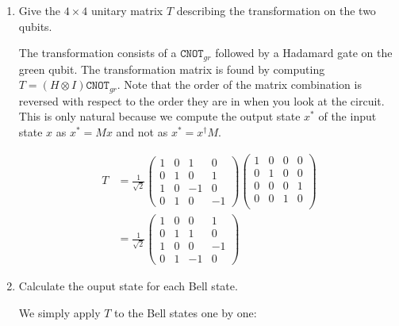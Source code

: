 \documentclass[12pt]{article}
\newcommand{\pmat}[1]{\begin{pmatrix}#1\end{pmatrix}}
\newcommand{\rsqrt}[1]{\ensuremath{\frac{1}{\sqrt{#1}}}}
\newenvironment{answer}{\begingroup\setlength{\leftskip}{-\leftmargin}\begin{framed}}{\end{framed}\endgroup}
\newcommand{\CNOT}[1]{\ensuremath{\texttt{CNOT}_{#1}}}
\newcommand{\cnotgr}[1]{\ensuremath{\pmat{%
        1 & 0 & 0 & 0 \\%
        0 & 1 & 0 & 0 \\%
        0 & 0 & 0 & 1 \\%
        0 & 0 & 1 & 0 \\%
}}}
\begin{document}
\begin{enumerate}
    \item Give the $4 \times 4$ unitary matrix $T$ describing the transformation on the two qubits.

    \begin{answer}
        The transformation consists of a \CNOT{gr} followed by a Hadamard gate on the green qubit. The transformation matrix is found by computing $T = (H \otimes I)\CNOT{gr}$. Note that the order of the matrix combination is reversed with respect to the order they are in when you look at the circuit. This is only natural because we compute the output state $x^*$ of the input state $x$  as $x^* = Mx$ and not as $x^* = x^\dagger{}M$.

        \begin{align*}
            T &= \rsqrt{2}\pmat{1&0&1&0\\0&1&0&1\\1&0&-1&0\\0&1&0&-1}\cnotgr{} \\
            &= \rsqrt{2}\pmat{1&0&0&1\\0&1&1&0\\1&0&0&-1\\0&1&-1&0}
        \end{align*}
    \end{answer}

    \item Calculate the ouput state for each Bell state.

    \begin{answer}
        We simply apply $T$ to the Bell states one by one:


\end{answer}
\end{enumerate}
\end{document}
